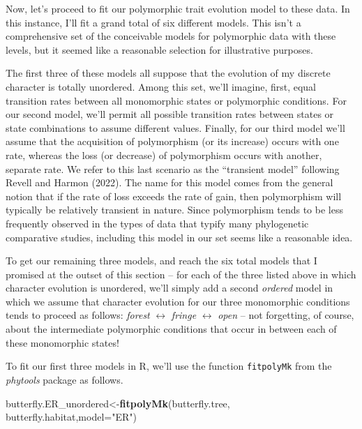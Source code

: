 \documentclass[fleqn,10pt,lineno]{wlpeerj} %
\newenvironment{Shaded}{\begin{snugshade}}{\end{snugshade}}
\newcommand{\AttributeTok}[1]{\textcolor[rgb]{0.13,0.29,0.53}{#1}}
\newcommand{\FunctionTok}[1]{\textcolor[rgb]{0.13,0.29,0.53}{\textbf{#1}}}
\newcommand{\NormalTok}[1]{#1}
\newcommand{\OtherTok}[1]{\textcolor[rgb]{0.56,0.35,0.01}{#1}}
\newcommand{\StringTok}[1]{\textcolor[rgb]{0.31,0.60,0.02}{#1}}
\begin{document}
Now, let's proceed to fit our polymorphic trait evolution model to these data. In this instance, I'll fit a grand total of six different models. This isn't a comprehensive set of the conceivable models for polymorphic data with these levels, but it seemed like a reasonable selection for illustrative purposes.

The first three of these models all suppose that the evolution of my discrete character is totally unordered. Among this set, we'll imagine, first, equal transition rates between all monomorphic states or polymorphic conditions. For our second model, we'll permit all possible transition rates between states or state combinations to assume different values. Finally, for our third model we'll assume that the acquisition of polymorphism (or its increase) occurs with one rate, whereas the loss (or decrease) of polymorphism occurs with another, separate rate. We refer to this last scenario as the ``transient model'' following Revell and Harmon (2022). The name for this model comes from the general notion that if the rate of loss exceeds the rate of gain, then polymorphism will typically be relatively transient in nature. Since polymorphism tends to be less frequently observed in the types of data that typify many phylogenetic comparative studies, including this model in our set seems like a reasonable idea.

To get our remaining three models, and reach the six total models that I promised at the outset of this section -- for each of the three listed above in which character evolution is unordered, we'll simply add a second \emph{ordered} model in which we assume that character evolution for our three monomorphic conditions tends to proceed as follows: \emph{forest} \(\leftrightarrow\) \emph{fringe} \(\leftrightarrow\) \emph{open} -- not forgetting, of course, about the intermediate polymorphic conditions that occur in between each of these monomorphic states!

To fit our first three models in R, we'll use the function \texttt{fitpolyMk} from the \emph{phytools} package as follows.

\begin{Shaded}
\begin{Highlighting}[]
\NormalTok{butterfly.ER\_unordered}\OtherTok{\textless{}{-}}\FunctionTok{fitpolyMk}\NormalTok{(butterfly.tree,}
\NormalTok{  butterfly.habitat,}\AttributeTok{model=}\StringTok{"ER"}\NormalTok{)}
\end{Highlighting}
\end{Shaded}
\end{document}
